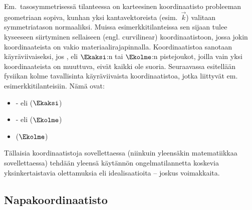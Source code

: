 Em.\ tasosymmetrisessä tilanteessa on karteesinen koordinaatisto probleeman 
geometriaan sopiva, kunhan yksi kantavektoreista (esim.\ $\vec k$) valitaan symmetriatason
normaaliksi. Muissa esimerkkitilanteissa sen sijaan tulee kyseeseen siirtyminen sellaiseen 
 (engl. curvilinear) koordinaatistoon, jossa jokin koordinaateista on vakio 
materiaalirajapinnalla. Koordinaatistoa sanotaan käyräviivaiseksi, jos
%
,
eli $\Ekaksi$:n tai $\Ekolme$:n pistejoukot, joilla vain yksi koordinaateista on muuttuva, eivät
kaikki ole suoria. Seuraavassa esitellään fysiikan kolme tavallisinta käyräviivaista 
koordinaatistoa, jotka liittyvät em. esimerkkitilanteisiin. Nämä ovat:
%
%
\begin{itemize}
\item  {}- eli  ($\Ekaksi$)
\item  {}- eli  ($\Ekolme$)
\item  {} ($\Ekolme$)
\end{itemize}
Tällaisia koordinaatistoja sovellettaessa (niinkuin yleensäkin matematiikkaa sovellettaessa) 
tehdään yleensä käytännön ongelmatilannetta koskevia yksinkertaistavia olettamuksia eli 
idealisaatioita -- joskus voimakkaita.

\subsection*{Napakoordinaatisto}

